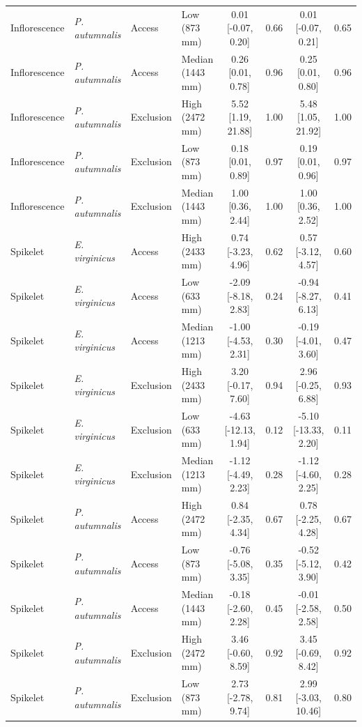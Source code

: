 \begin{landscape}
\begin{longtable}{llllcccc}
  Inflorescence & \textit{P. autumnalis} & Access & Low (873 mm) & 0.01 [-0.07, 0.20] & 0.66 & 0.01 [-0.07, 0.21] & 0.65 \\
  Inflorescence & \textit{P. autumnalis} & Access & Median (1443 mm) & 0.26 [0.01, 0.78] & 0.96 & 0.25 [0.01, 0.80] & 0.96 \\
  Inflorescence & \textit{P. autumnalis} & Exclusion & High (2472 mm) & 5.52 [1.19, 21.88] & 1.00 & 5.48 [1.05, 21.92] & 1.00 \\
  Inflorescence & \textit{P. autumnalis} & Exclusion & Low (873 mm) & 0.18 [0.01, 0.89] & 0.97 & 0.19 [0.01, 0.96] & 0.97 \\
  Inflorescence & \textit{P. autumnalis} & Exclusion & Median (1443 mm) & 1.00 [0.36, 2.44] & 1.00 & 1.00 [0.36, 2.52] & 1.00 \\
  Spikelet & \textit{E. virginicus} & Access & High (2433 mm) & 0.74 [-3.23, 4.96] & 0.62 & 0.57 [-3.12, 4.57] & 0.60 \\
  Spikelet & \textit{E. virginicus} & Access & Low (633 mm) & -2.09 [-8.18, 2.83] & 0.24 & -0.94 [-8.27, 6.13] & 0.41 \\
  Spikelet & \textit{E. virginicus} & Access & Median (1213 mm) & -1.00 [-4.53, 2.31] & 0.30 & -0.19 [-4.01, 3.60] & 0.47 \\
  Spikelet & \textit{E. virginicus} & Exclusion & High (2433 mm) & 3.20 [-0.17, 7.60] & 0.94 & 2.96 [-0.25, 6.88] & 0.93 \\
  Spikelet & \textit{E. virginicus} & Exclusion & Low (633 mm) & -4.63 [-12.13, 1.94] & 0.12 & -5.10 [-13.33, 2.20] & 0.11 \\
  Spikelet & \textit{E. virginicus} & Exclusion & Median (1213 mm) & -1.12 [-4.49, 2.23] & 0.28 & -1.12 [-4.60, 2.25] & 0.28 \\
  Spikelet & \textit{P. autumnalis} & Access & High (2472 mm) & 0.84 [-2.35, 4.34] & 0.67 & 0.78 [-2.25, 4.28] & 0.67 \\
  Spikelet & \textit{P. autumnalis} & Access & Low (873 mm) & -0.76 [-5.08, 3.35] & 0.35 & -0.52 [-5.12, 3.90] & 0.42 \\
  Spikelet & \textit{P. autumnalis} & Access & Median (1443 mm) & -0.18 [-2.60, 2.28] & 0.45 & -0.01 [-2.58, 2.58] & 0.50 \\
  Spikelet & \textit{P. autumnalis} & Exclusion & High (2472 mm) & 3.46 [-0.60, 8.59] & 0.92 & 3.45 [-0.69, 8.42] & 0.92 \\
  Spikelet & \textit{P. autumnalis} & Exclusion & Low (873 mm) & 2.73 [-2.78, 9.74] & 0.81 & 2.99 [-3.03, 10.46] & 0.80 \\

\end{longtable}
\end{landscape}
